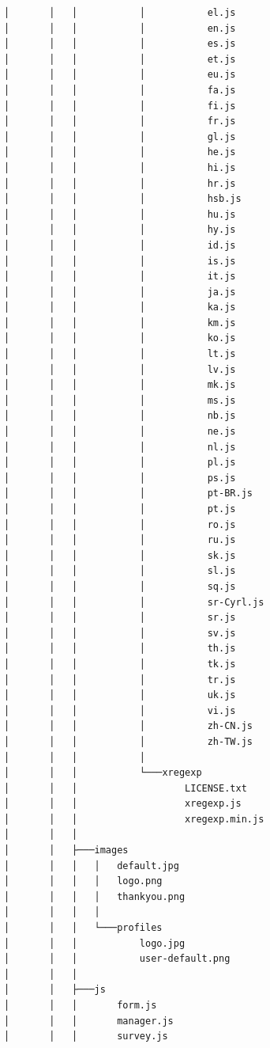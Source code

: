 \documentclass[letterpaper, 12 pt, conference]{ieeeconf}
\begin{document}
\begin{lstlisting}
│       │   │           │           el.js
│       │   │           │           en.js
│       │   │           │           es.js
│       │   │           │           et.js
│       │   │           │           eu.js
│       │   │           │           fa.js
│       │   │           │           fi.js
│       │   │           │           fr.js
│       │   │           │           gl.js
│       │   │           │           he.js
│       │   │           │           hi.js
│       │   │           │           hr.js
│       │   │           │           hsb.js
│       │   │           │           hu.js
│       │   │           │           hy.js
│       │   │           │           id.js
│       │   │           │           is.js
│       │   │           │           it.js
│       │   │           │           ja.js
│       │   │           │           ka.js
│       │   │           │           km.js
│       │   │           │           ko.js
│       │   │           │           lt.js
│       │   │           │           lv.js
│       │   │           │           mk.js
│       │   │           │           ms.js
│       │   │           │           nb.js
│       │   │           │           ne.js
│       │   │           │           nl.js
│       │   │           │           pl.js
│       │   │           │           ps.js
│       │   │           │           pt-BR.js
│       │   │           │           pt.js
│       │   │           │           ro.js
│       │   │           │           ru.js
│       │   │           │           sk.js
│       │   │           │           sl.js
│       │   │           │           sq.js
│       │   │           │           sr-Cyrl.js
│       │   │           │           sr.js
│       │   │           │           sv.js
│       │   │           │           th.js
│       │   │           │           tk.js
│       │   │           │           tr.js
│       │   │           │           uk.js
│       │   │           │           vi.js
│       │   │           │           zh-CN.js
│       │   │           │           zh-TW.js
│       │   │           │
│       │   │           └───xregexp
│       │   │                   LICENSE.txt
│       │   │                   xregexp.js
│       │   │                   xregexp.min.js
│       │   │
│       │   ├───images
│       │   │   │   default.jpg
│       │   │   │   logo.png
│       │   │   │   thankyou.png
│       │   │   │
│       │   │   └───profiles
│       │   │           logo.jpg
│       │   │           user-default.png
│       │   │
│       │   ├───js
│       │   │       form.js
│       │   │       manager.js
│       │   │       survey.js

\end{lstlisting}
\end{document}
